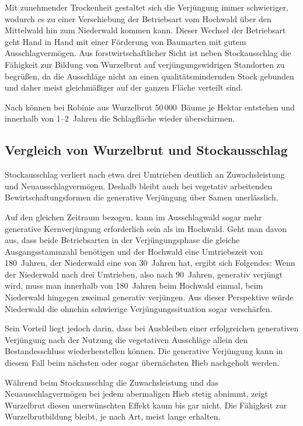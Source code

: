 \documentclass[twocolumn]{scrartcl}
\begin{document}
Mit zunehmender Trockenheit gestaltet sich die Verjüngung immer
schwieriger, wodurch es zu einer Verschiebung der Betriebsart vom
Hochwald über den Mittelwald hin zum Niederwald kommen kann. Dieser
Wechsel der Betriebsart geht Hand in Hand mit einer Förderung von
Baumarten mit gutem Ausschlagvermögen. Aus forstwirtschaftlicher Sicht
ist neben Stockausschlag die Fähigkeit zur Bildung von Wurzelbrut auf
verjüngungswidrigen Standorten zu begrüßen, da die Ausschläge nicht an
einen qualitätsmindernden Stock gebunden und daher meist gleichmäßiger
auf der ganzen Fläche verteilt sind.

Nach \citet{nicolescu2019robinie} können bei Robinie aus Wurzelbrut
50\,000~Bäume je Hektar entstehen und innerhalb von 1–2~Jahren die
Schlagfläche wieder überschirmen.

\subsection{Vergleich von Wurzelbrut und Stockausschlag}

Stockausschlag verliert nach etwa drei Umtrieben deutlich an
Zuwachsleistung und Neuausschlagvermögen. Deshalb bleibt auch bei
vegetativ arbeitenden Bewirtschaftungsformen die generative Verjüngung
über Samen unerlässlich.

Auf den gleichen Zeitraum bezogen, kann im Ausschlagwald sogar mehr
generative Kernverjüngung erforderlich sein als im Hochwald. Geht man
davon aus, dass beide Betriebsarten in der Verjüngungsphase die
gleiche Ausgangsstammzahl benötigen und der Hochwald eine Umtriebszeit
von 180~Jahren, der Niederwald eine von 30~Jahren hat, ergibt sich
Folgendes: Wenn der Niederwald nach drei Umtrieben, also nach
90~Jahren, generativ verjüngt wird, muss man innerhalb von 180~Jahren
beim Hochwald einmal, beim Niederwald hingegen zweimal generativ
verjüngen. Aus dieser Perspektive würde Niederwald die ohnehin
schwierige Verjüngungssituation sogar verschärfen.

Sein Vorteil liegt jedoch darin, dass bei Ausbleiben einer
erfolgreichen generativen Verjüngung nach der Nutzung die vegetativen
Ausschläge allein den Bestandesschluss wiederherstellen können. Die
generative Verjüngung kann in diesem Fall beim nächsten oder sogar
übernächsten Hieb nachgeholt werden.

Während beim Stockausschlag die Zuwachsleistung und das
Neuausschlagvermögen bei jedem abermaligen Hieb stetig abnimmt, zeigt
Wurzelbrut diesen unerwünschten Effekt kaum bis gar nicht. Die
Fähigkeit zur Wurzelbrutbildung bleibt, je nach Art, meist lange
erhalten.
\end{document}
